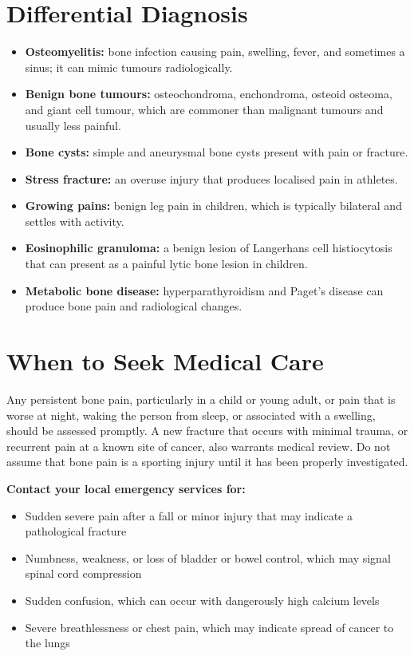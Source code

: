 \section*{Differential Diagnosis}
\begin{itemize}
    \item \textbf{Osteomyelitis:} bone infection causing pain, swelling, fever, and sometimes a sinus; it can mimic tumours radiologically.
    \item \textbf{Benign bone tumours:} osteochondroma, enchondroma, osteoid osteoma, and giant cell tumour, which are commoner than malignant tumours and usually less painful.
    \item \textbf{Bone cysts:} simple and aneurysmal bone cysts present with pain or fracture.
    \item \textbf{Stress fracture:} an overuse injury that produces localised pain in athletes.
    \item \textbf{Growing pains:} benign leg pain in children, which is typically bilateral and settles with activity.
    \item \textbf{Eosinophilic granuloma:} a benign lesion of Langerhans cell histiocytosis that can present as a painful lytic bone lesion in children.
    \item \textbf{Metabolic bone disease:} hyperparathyroidism and Paget's disease can produce bone pain and radiological changes.
\end{itemize}

\section*{When to Seek Medical Care}
Any persistent bone pain, particularly in a child or young adult, or pain that is worse at night, waking the person from sleep, or associated with a swelling, should be assessed promptly. A new fracture that occurs with minimal trauma, or recurrent pain at a known site of cancer, also warrants medical review. Do not assume that bone pain is a sporting injury until it has been properly investigated.

\textbf{Contact your local emergency services for:}
\begin{itemize}
    \item Sudden severe pain after a fall or minor injury that may indicate a pathological fracture
    \item Numbness, weakness, or loss of bladder or bowel control, which may signal spinal cord compression
    \item Sudden confusion, which can occur with dangerously high calcium levels
    \item Severe breathlessness or chest pain, which may indicate spread of cancer to the lungs
\end{itemize}

